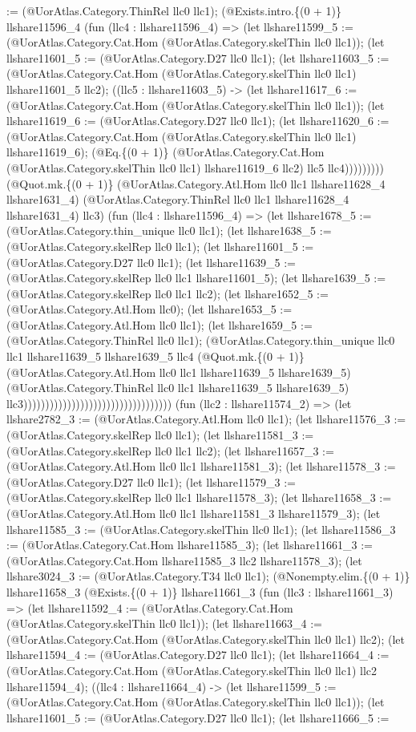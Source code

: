 \documentclass[11pt]{article}
\begin{document}
:= (@UorAtlas.Category.ThinRel llc0 llc1); (@Exists.intro.\{(0 + 1)\} llshare11596\_4 (fun (llc4 : llshare11596\_4) => (let llshare11599\_5 := (@UorAtlas.Category.Cat.Hom (@UorAtlas.Category.skelThin llc0 llc1)); (let llshare11601\_5 := (@UorAtlas.Category.D27 llc0 llc1); (let llshare11603\_5 := (@UorAtlas.Category.Cat.Hom (@UorAtlas.Category.skelThin llc0 llc1) llshare11601\_5 llc2); ((llc5 : llshare11603\_5) -> (let llshare11617\_6 := (@UorAtlas.Category.Cat.Hom (@UorAtlas.Category.skelThin llc0 llc1)); (let llshare11619\_6 := (@UorAtlas.Category.D27 llc0 llc1); (let llshare11620\_6 := (@UorAtlas.Category.Cat.Hom (@UorAtlas.Category.skelThin llc0 llc1) llshare11619\_6); (@Eq.\{(0 + 1)\} (@UorAtlas.Category.Cat.Hom (@UorAtlas.Category.skelThin llc0 llc1) llshare11619\_6 llc2) llc5 llc4))))))))) (@Quot.mk.\{(0 + 1)\} (@UorAtlas.Category.Atl.Hom llc0 llc1 llshare11628\_4 llshare1631\_4) (@UorAtlas.Category.ThinRel llc0 llc1 llshare11628\_4 llshare1631\_4) llc3) (fun (llc4 : llshare11596\_4) => (let llshare1678\_5 := (@UorAtlas.Category.thin\_unique llc0 llc1); (let llshare1638\_5 := (@UorAtlas.Category.skelRep llc0 llc1); (let llshare11601\_5 := (@UorAtlas.Category.D27 llc0 llc1); (let llshare11639\_5 := (@UorAtlas.Category.skelRep llc0 llc1 llshare11601\_5); (let llshare1639\_5 := (@UorAtlas.Category.skelRep llc0 llc1 llc2); (let llshare1652\_5 := (@UorAtlas.Category.Atl.Hom llc0); (let llshare1653\_5 := (@UorAtlas.Category.Atl.Hom llc0 llc1); (let llshare1659\_5 := (@UorAtlas.Category.ThinRel llc0 llc1); (@UorAtlas.Category.thin\_unique llc0 llc1 llshare11639\_5 llshare1639\_5 llc4 (@Quot.mk.\{(0 + 1)\} (@UorAtlas.Category.Atl.Hom llc0 llc1 llshare11639\_5 llshare1639\_5) (@UorAtlas.Category.ThinRel llc0 llc1 llshare11639\_5 llshare1639\_5) llc3)))))))))))))))))))))))))))))))))) (fun (llc2 : llshare11574\_2) => (let llshare2782\_3 := (@UorAtlas.Category.Atl.Hom llc0 llc1); (let llshare11576\_3 := (@UorAtlas.Category.skelRep llc0 llc1); (let llshare11581\_3 := (@UorAtlas.Category.skelRep llc0 llc1 llc2); (let llshare11657\_3 := (@UorAtlas.Category.Atl.Hom llc0 llc1 llshare11581\_3); (let llshare11578\_3 := (@UorAtlas.Category.D27 llc0 llc1); (let llshare11579\_3 := (@UorAtlas.Category.skelRep llc0 llc1 llshare11578\_3); (let llshare11658\_3 := (@UorAtlas.Category.Atl.Hom llc0 llc1 llshare11581\_3 llshare11579\_3); (let llshare11585\_3 := (@UorAtlas.Category.skelThin llc0 llc1); (let llshare11586\_3 := (@UorAtlas.Category.Cat.Hom llshare11585\_3); (let llshare11661\_3 := (@UorAtlas.Category.Cat.Hom llshare11585\_3 llc2 llshare11578\_3); (let llshare3024\_3 := (@UorAtlas.Category.T34 llc0 llc1); (@Nonempty.elim.\{(0 + 1)\} llshare11658\_3 (@Exists.\{(0 + 1)\} llshare11661\_3 (fun (llc3 : llshare11661\_3) => (let llshare11592\_4 := (@UorAtlas.Category.Cat.Hom (@UorAtlas.Category.skelThin llc0 llc1)); (let llshare11663\_4 := (@UorAtlas.Category.Cat.Hom (@UorAtlas.Category.skelThin llc0 llc1) llc2); (let llshare11594\_4 := (@UorAtlas.Category.D27 llc0 llc1); (let llshare11664\_4 := (@UorAtlas.Category.Cat.Hom (@UorAtlas.Category.skelThin llc0 llc1) llc2 llshare11594\_4); ((llc4 : llshare11664\_4) -> (let llshare11599\_5 := (@UorAtlas.Category.Cat.Hom (@UorAtlas.Category.skelThin llc0 llc1)); (let llshare11601\_5 := (@UorAtlas.Category.D27 llc0 llc1); (let llshare11666\_5 := 
\end{document}
